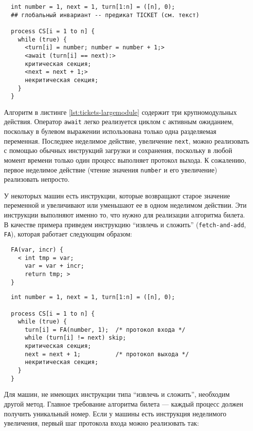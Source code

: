 \lstset{label=lst:tickets-largemodule,
  caption=Алгоритм билета: крупномодульное решение}
\begin{lstlisting}
  int number = 1, next = 1, turn[1:n] = ([n], 0);
  ## глобальный инвариант -- предикат TICKET (см. текст)

  process CS[i = 1 to n] {
    while (true) {
      <turn[i] = number; number = number + 1;>
      <await (turn[i] == next):>
      критическая секция;
      <next = next + 1;>
      некритическая секция;
    }
  }
\end{lstlisting}

Алгоритм в листинге \ref{lst:tickets-largemodule} содержит три крупномодульных
действия. Оператор \texttt{await} легко реализуется циклом с активным ожиданием,
поскольку в булевом выражении использована только одна разделяемая
переменная. Последнее неделимое действие, увеличение \texttt{next}, можно
реализовать с помощью обычных инструкций загрузки и сохранения, поскольку в
любой момент времени только один процесс выполняет протокол выхода. К сожалению,
первое неделимое действие (чтение значения \texttt{number} и его увеличение)
реализовать непросто.

У некоторых машин есть инструкции, которые возвращают старое значение переменной
и увеличивают или уменьшают ее в одном неделимом действии. Эти инструкции
выполняют именно то, что нужно для реализации алгоритма билета. В качестве
примера приведем инструкцию ``извлечь и сложить'' (\texttt{fetch-and-add},
\texttt{FA}), которая работает следующим образом:

\lstset{caption=}
\begin{lstlisting}
  FA(var, incr) {
    < int tmp = var;
      var = var + incr;
      return tmp; >
  }
\end{lstlisting}

\lstset{label=lst:tickets-smallmodule,
  caption=Алгорим билета: мелкомодульное решение}
\begin{lstlisting}
  int number = 1, next = 1, turn[1:n] = ([n], 0);

  process CS[i = 1 to n] {
    while (true) {
      turn[i] = FA(number, 1);  /* протокол входа */
      while (turn[i] != next) skip;
      критическая секция;
      next = next + 1;          /* протокол выхода */
      некритическая секция;
    }
  }
\end{lstlisting}

Для машин, не имеющих инструкции типа ``извлечь и сложить'', необходим другой
метод. Главное требование алгоритма билета --- каждый процесс должен получить
уникальный номер. Если у машины есть инструкция неделимого увеличения, первый
шаг протокола входа можно реализовать так:

